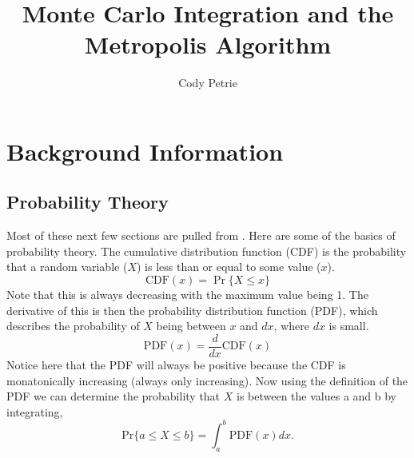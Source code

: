 \documentclass[12pt]{extarticle}
\title{Monte Carlo Integration and the Metropolis Algorithm}
\author{Cody Petrie}
\newcommand{\Prob}{\mathrm{Pr}}
\newcommand{\CDF}{\mathrm{CDF}}
\newcommand{\PDF}{\mathrm{PDF}}
\begin{document}
\maketitle

\section{Background Information}

\subsection{Probability Theory}
Most of these next few sections are pulled from \cite{jarosz2008}. Here are some of the basics of probability theory. The cumulative distribution function (CDF) is the probability that a random variable ($X$) is less than or equal to some value ($x$).
\begin{equation}
  \CDF(x) = \Pr\{X \le x \}
  \label{equ:cdfdef}
\end{equation}
Note that this is always decreasing with the maximum value being 1. The derivative of this is then the probability distribution function (PDF), which describes the probability of $X$ being between $x$ and $dx$, where $dx$ is small.
\begin{equation}
  \PDF(x) = \frac{d}{dx} \CDF(x)
  \label{equ:pdfdef}
\end{equation}
Notice here that the PDF will always be positive because the CDF is monatonically increasing (always only increasing). Now using the definition of the PDF we can determine the probability that $X$ is between the values a and b by integrating,
\begin{equation}
  \Prob \{a \le X \le b\} = \int_a^b \PDF(x) dx.
\end{equation}
\end{document}
